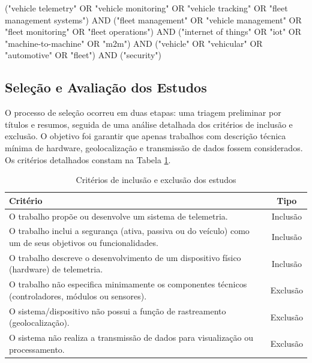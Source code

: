 \documentclass[
	article,			%
	11pt,				%
	oneside,			%
	a4paper,			%
	english,			%
	brazil,				%
	sumario=tradicional
	]{abntex2}
\begin{document}
\vspace{10pt}

\begin{tcolorbox}[title=String de busca — IEEE Xplore]
   ("vehicle telemetry" OR "vehicle monitoring" OR "vehicle tracking" OR
   "fleet management systems")
   AND ("fleet management" OR "vehicle management" OR "fleet monitoring"
   OR "fleet operations")
   AND ("internet of things" OR "iot" OR "machine-to-machine" OR "m2m")
   AND ("vehicle" OR "vehicular" OR "automotive" OR "fleet")
   AND ("security")
\end{tcolorbox}

\subsection{Seleção e Avaliação dos Estudos}

O processo de seleção ocorreu em duas etapas: uma triagem preliminar por títulos e resumos, seguida de uma análise detalhada dos critérios de inclusão e exclusão. O objetivo foi garantir que apenas trabalhos com descrição técnica mínima de hardware, geolocalização e transmissão de dados fossem considerados. Os critérios detalhados constam na Tabela \ref{tab:criterios_selecao}.

\begin{table}[H]
   \centering
   \caption{Critérios de inclusão e exclusão dos estudos}
   \label{tab:criterios_selecao}
   \begin{tabular}{|p{10cm}|c|}
      \hline
      \textbf{Critério}                                                                                          & \textbf{Tipo} \\
      \hline
      O trabalho propõe ou desenvolve um sistema de telemetria.                                                  & Inclusão      \\
      \hline
      O trabalho inclui a segurança (ativa, passiva ou do veículo) como um de seus objetivos ou funcionalidades. & Inclusão      \\
      \hline
      O trabalho descreve o desenvolvimento de um dispositivo físico (hardware) de telemetria.                   & Inclusão      \\
      \hline
      O trabalho não especifica minimamente os componentes técnicos (controladores, módulos ou sensores).        & Exclusão      \\
      \hline
      O sistema/dispositivo não possui a função de rastreamento (geolocalização).                                & Exclusão      \\
      \hline
      O sistema não realiza a transmissão de dados para visualização ou processamento.                           & Exclusão      \\
      \hline
   \end{tabular}
\end{table}
\end{document}
